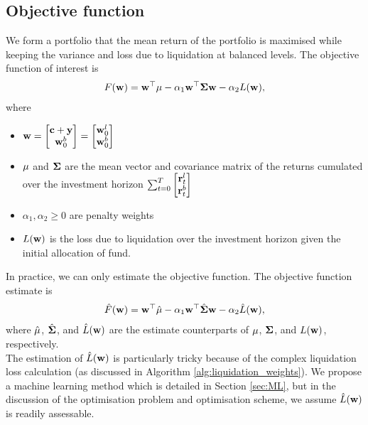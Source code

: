 \documentclass{article} %
\theoremstyle{plain}
\theoremstyle{definition} %
\begin{document}
\subsection{Objective function}
We form a portfolio that the mean return of the portfolio is maximised while keeping the variance and loss due to liquidation at balanced levels.
 The objective function of interest is
 \begin{align}
  F({\bf w}) = {\bf w}^\top {\bf \mu} - \alpha_1 {\bf w}^\top {\bf \Sigma}{\bf w} - \alpha_2 L({\bf w}),
 \end{align}
 where 
 \begin{itemize}
 \item ${\bf w} = \begin{bmatrix} 
  {\bf c} + {\bf y} \\  {\bf w}^b_0 \end{bmatrix} = \begin{bmatrix} 
  {\bf w}^l_0 \\  {\bf w}^b_0 \end{bmatrix}$
  \item  ${\bf \mu}$ and ${\bf \Sigma}$ are the mean vector and covariance matrix of the returns cumulated over the investment horizon
  $\sum_{t=0}^T \begin{bmatrix}
    {\bf r}^l_t \\ {\bf r}^b_t
    \end{bmatrix}$
  \item $\alpha_1 , \alpha_2 \geq 0$ are penalty weights
  \item $L({\bf w})$ is the loss due to liquidation over the investment horizon given the initial allocation of fund. 
 \end{itemize}

In practice, we can only estimate the objective function. 
 The objective function estimate is 
 \begin{align}
  \hat F({\bf w}) = {\bf w}^\top \hat {\bf \mu} - \alpha_1 {\bf w}^\top \hat {\bf \Sigma}{\bf w} - \alpha_2 \hat L({\bf w}),
 \end{align}
 where $\hat {\bf \mu}$, $\hat {\bf \Sigma}$, and $\hat L({\bf w})$ are the estimate counterparts of ${\bf \mu}$, ${\bf \Sigma}$, and $L({\bf w})$, respectively. \\

The estimation of $\hat L({\bf w})$ is particularly tricky because of the complex liquidation loss calculation (as discussed in Algorithm \ref{alg:liquidation_weights}). 
 We propose a machine learning method which is detailed in Section \ref{sec:ML}, 
 but in the discussion of the optimisation problem and optimisation scheme, 
 we assume $\hat L({\bf w})$ is readily assessable. \\
\end{document}

